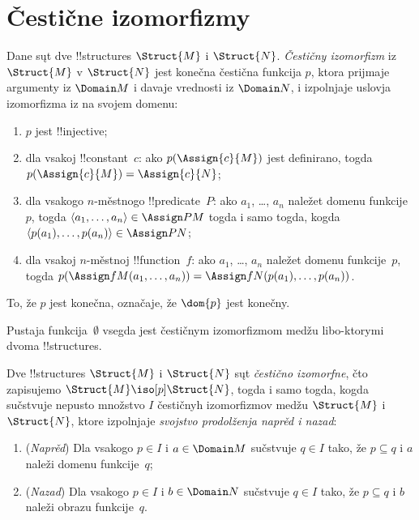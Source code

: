 \documentclass[../../../include/open-logic-section]{subfiles}
\begin{document}
\section{Čestične izomorfizmy}

\begin{defn}
  Dane sųt dve !!{structure}s $\Struct{M}$ i $\Struct{N}$. 
  \emph{Čestičny izomorfizm} iz $\Struct{M}$ v $\Struct{N}$ jest
  konečna čestična funkcija $p$, ktora prijmaje argumenty iz $\Domain M$ i
  davaje vrednosti iz $\Domain N$, i izpolnjaje uslovja izomorfizma iz
   na svojem domenu:
  \begin{enumerate}
  \item $p$ jest !!{injective};
  \item dla vsakoj !!{constant}~$c$: ako $p(\Assign{c}{M})$ jest
    definirano, togda $p(\Assign{c}{M}) = \Assign{c}{N}$;
  \item dla vsakogo $n$-městnogo !!{predicate}~$P$: ako $a_1$, \dots,
    $a_n$ naležet domenu funkcije~$p$, togda $\langle a_1, \dots, a_n\rangle \in
    \Assign P M$ togda i samo togda, kogda
    $\langle p(a_1), \dots, p(a_n) \rangle
    \in \Assign P N$;
  \item dla vsakoj $n$-městnoj !!{function}~$f$: ako $a_1$, \dots,
    $a_n$ naležet domenu funkcije~$p$, togda
    $p(\Assign f M (a_1, \dots,a_n))
    = \Assign f N (p(a_1), \dots, p(a_n))$.
  \end{enumerate}
  To, že $p$ jest konečna, označaje, že $\dom{p}$ jest konečny.
\end{defn}

Pustaja funkcija~$\emptyset$ vsegda jest čestičnym izomorfizmom medžu
libo-ktorymi dvoma !!{structure}s.

\begin{defn}
  Dve !!{structure}s $\Struct{M}$ i $\Struct{N}$ sųt
  \emph{čestično izomorfne}, čto zapisujemo $\Struct{M} \iso[p]
  \Struct{N}$, togda i samo togda, kogda sučstvuje nepusto množstvo $I$
  čestičnyh izomorfizmov medžu $\Struct{M}$ i $\Struct{N}$, ktore
  izpolnjaje \emph{svojstvo prodolženja naprěd i nazad}:
  \begin{enumerate}
  \item (\emph{Naprěd}) Dla vsakogo $p \in I$ i $a \in \Domain M$
    sučstvuje $q \in I$ tako, že $p \subseteq q$ i $a$ naleži domenu
    funkcije~$q$;
  \item (\emph{Nazad}) Dla vsakogo $p \in I$ i $b \in \Domain N$
    sučstvuje $q \in I$ tako, že $p \subseteq q$ i $b$ naleži obrazu
    funkcije~$q$.
  \end{enumerate}
\end{defn}
\end{document}
